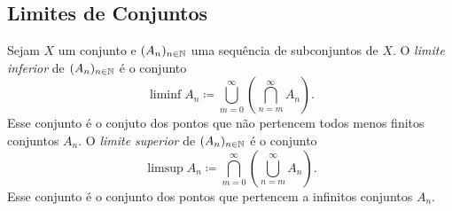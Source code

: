 

\subsection{Limites de Conjuntos}

\begin{defi}
	Sejam $X$ um conjunto e $(A_n)_{n \in \mathbb{N}}$ uma sequência de subconjuntos de $X$. O \emph{limite inferior} de $(A_n)_{n \in \mathbb{N}}$ é o conjunto
	\begin{equation*}
	\liminf A_n \coloneqq \bigcup_{m=0}^\infty \left( \bigcap_{n=m}^\infty A_n \right).
	\end{equation*}
	Esse conjunto é o conjuto dos pontos que não pertencem todos menos finitos conjuntos $A_n$.
O \emph{limite superior} de $(A_n)_{n \in \mathbb{N}}$ é o conjunto
	\begin{equation*}
	\limsup A_n \coloneqq \bigcap_{m=0}^\infty \left( \bigcup_{n=m}^\infty A_n \right).
	\end{equation*}
	Esse conjunto é o conjunto dos pontos que pertencem a infinitos conjuntos $A_n$.
\end{defi}

